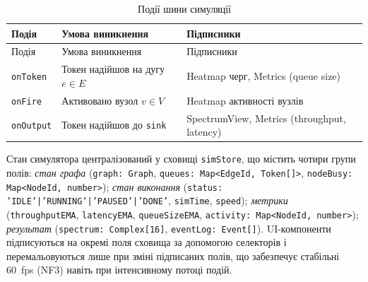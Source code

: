 \begin{longtable}[]{@{}
  >{\raggedright\arraybackslash}p{}
  >{\raggedright\arraybackslash}p{}
  >{\raggedright\arraybackslash}p{}@{}}
\caption[Події шини симуляції]{Події шини симуляції}\tabularnewline
\toprule\noalign{}
\begin{minipage}[b]{\linewidth}\raggedright
Подія
\end{minipage} & \begin{minipage}[b]{\linewidth}\raggedright
Умова виникнення
\end{minipage} & \begin{minipage}[b]{\linewidth}\raggedright
Підписники
\end{minipage} \\
\midrule\noalign{}
\endfirsthead
\toprule\noalign{}
\begin{minipage}[b]{\linewidth}\raggedright
Подія
\end{minipage} & \begin{minipage}[b]{\linewidth}\raggedright
Умова виникнення
\end{minipage} & \begin{minipage}[b]{\linewidth}\raggedright
Підписники
\end{minipage} \\
\midrule\noalign{}
\endhead
\bottomrule\noalign{}
\endlastfoot
\texttt{onToken} & Токен надійшов на дугу \(e\in E\) & Heatmap черг,
Metrics (queue size) \\
\texttt{onFire} & Активовано вузол \(v\in V\) & Heatmap активності
вузлів \\
\texttt{onOutput} & Токен надійшов до \texttt{sink} & SpectrumView,
Metrics (throughput, latency) \\
\end{longtable}

Стан симулятора централізований у сховищі \texttt{simStore}, що містить
чотири групи полів: \emph{стан графа} (\texttt{graph: Graph},
\texttt{queues: Map<EdgeId, Token[]>},
\texttt{nodeBusy: Map<NodeId, number>}); \emph{стан виконання}
(\texttt{status: 'IDLE'|'RUNNING'|'PAUSED'|'DONE'}, \texttt{simTime},
\texttt{speed}); \emph{метрики} (\texttt{throughputEMA},
\texttt{latencyEMA}, \texttt{queueSizeEMA},
\texttt{activity: Map<NodeId, number>}); \emph{результат}
(\texttt{spectrum: Complex[16]}, \texttt{eventLog: Event[]}). UI-компоненти
підписуються на окремі поля сховища за допомогою селекторів і
перемальовуються лише при зміні підписаних полів, що забезпечує стабільні
60~fps (NF3) навіть при інтенсивному потоці подій.

